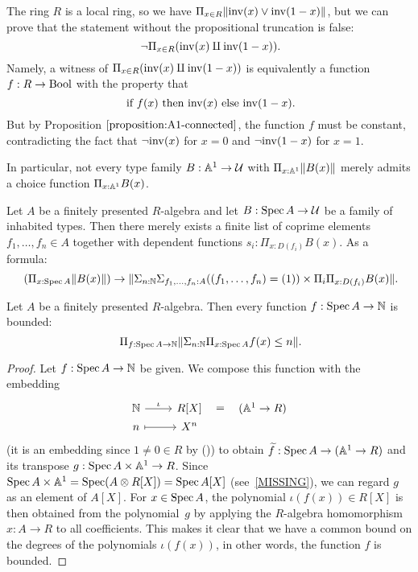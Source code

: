 \documentclass{zariski}
\begin{document}

\begin{example}
  The ring $R$ is a local ring, so we have
  $\Pi_{x \in R} \lVert \mathrm{inv}(x) \lor \mathrm{inv}(1 - x) \rVert$,
  but we can prove that
  the statement without the propositional truncation is false:
  \[ \lnot \Pi_{x \in R} (\inv(x) \amalg \inv(1 - x)) \rlap{.} \]
  Namely,
  a witness of $\Pi_{x \in R} (\mathrm{inv}(x) \amalg \mathrm{inv}(1 - x))$
  is equivalently a function $f : R \to \mathrm{Bool}$
  with the property that
  \[ \text{if $f(x)$ then $\inv(x)$ else $\inv(1 - x)$} \rlap{.} \]
  But by Proposition $\ref{proposition:A1-connected}$,
  the function $f$ must be constant,
  contradicting the fact that
  $\lnot\mathrm{inv}(x)$ for $x = 0$ and $\lnot\mathrm{inv}(1 - x)$ for $x = 1$.

  In particular,
  not every type family $B : \mathbb{A}^1 \to \mathcal{U}$ with $\Pi_{x : \mathbb{A}^1} \lVert B(x) \rVert$
  merely admits a choice function $\Pi_{x : \mathbb{A}^1} B(x)$.
\end{example}

\begin{axiom}[Z-choice]%
  \label{Z-choice}
  Let $A$ be a finitely presented $R$-algebra
  and let $B : \operatorname{Spec} A \to \mathcal{U}$ be a family of inhabited types.
  Then there merely exists
  a finite list of coprime elements $f_1, \dots, f_n \in A$
  together with dependent functions $s_i : \Pi_{x : D(f_i)} B(x)$.
  As a formula:
  \[ (\Pi_{x : \Spec A} \propTrunc{B(x)}) \to
     \propTrunc{ \Sigma_{n : \N} \Sigma_{f_1, \dots, f_n : A}
      ((f_1, \dots, f_n) = (1)) \times
      \Pi_i \Pi_{x : D(f_i)} B(x) }
     \rlap{.}
  \]
\end{axiom}

\begin{theorem}%
  Let $A$ be a finitely presented $R$-algebra.
  Then every function $f : \operatorname{Spec} A \to \mathbb{N}$ is bounded:
  \[ \Pi_{f : \Spec A \to \N} \propTrunc{\Sigma_{n : \N} \Pi_{x : \Spec A} f(x) \le n}
     \rlap{.} \]
\end{theorem}

\begin{proof}
  Let $f : \operatorname{Spec} A \to \mathbb{N}$ be given.
  We compose this function with the embedding
  \[ \begin{tikzcd}[row sep=0mm]
    \N \ar[r, "\iota"] & R[X] \ar[r, phantom, "{=}"] & (\bA^1 \to R) \\
    n \ar[r, mapsto] & X^n
  \end{tikzcd} \]
  (it is an embedding since $1 \neq 0 \in R$ by ())
  to obtain $\widetilde{f} : \operatorname{Spec} A \to (\mathbb{A}^1 \to R)$
  and its transpose $g : \operatorname{Spec} A \times \mathbb{A}^1 \to R$.
  Since $\operatorname{Spec} A \times \mathbb{A}^1 = \operatorname{Spec} (A \otimes R[X]) = \operatorname{Spec} A[X]$
  (see~\ref{MISSING}),
  we can regard $g$ as an element of $A[X]$.
  For $x \in \operatorname{Spec} A$,
  the polynomial $\iota(f(x)) \in R[X]$ is then obtained from the polynomial~$g$
  by applying the $R$-algebra homomorphism $x : A \to R$ to all coefficients.
  This makes it clear that
  we have a common bound on the degrees of the polynomials $\iota(f(x))$,
  in other words,
  the function $f$ is bounded.
\end{proof}
\end{document}
